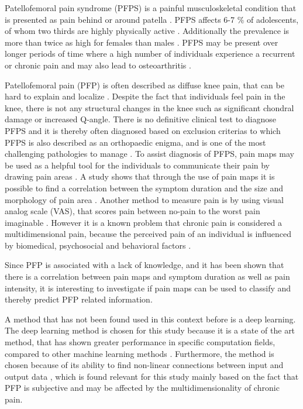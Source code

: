 Patellofemoral pain syndrome (PFPS) is a painful musculoskeletal condition that is presented as pain behind or around patella \citep{Maclachlan2017, Smith2015}. PFPS affects 6-7 \% of adolescents, of whom two thirds are highly physically active \citep{Rathleff2015}. Additionally the prevalence is more than twice as high for females than males \citep{Petersen2013, Rathleff2015}.
PFPS may be present over longer periods of time where a high number of individuals experience a recurrent or chronic pain \citep{Witvrouw2014} and may also lead to osteoarthritis \citep{Petersen2013, Crossley2016}.

\noindent
Patellofemoral pain (PFP) is often described as diffuse knee pain, that can be hard to explain and localize \citep{Witvrouw2014}. Despite the fact that individuals feel pain in the knee, there is not any structural changes in the knee such as significant chondral damage or increased Q-angle. There is no definitive clinical test to diagnose PFPS and it is thereby often diagnosed based on exclusion criterias \citep{Petersen2013} to which PFPS is also described as an orthopaedic enigma, and is one of the most challenging pathologies to manage \citep{Dye2001}. 
To assist diagnosis of PFPS, pain maps may be used as a helpful tool for the individuals to communicate their pain by drawing pain areas \citep{Boudreau2016}. A study shows that through the use of pain maps it is possible to find a correlation between the symptom duration and the size and morphology of pain area \citep{Boudreau2017}. 
Another method to measure pain is by using visual analog scale (VAS), that scores pain between no-pain to the worst pain imaginable \citep{Haefeli2005}. However it is a known problem that chronic pain is considered a multidimensional pain, because the perceived pain of an individual is influenced by biomedical, psychosocial and behavioral factors \citep{Dansie2013}.

\noindent
Since PFP is associated with a lack of knowledge, and it has been shown that there is a correlation between pain maps and symptom duration as well as pain intensity, it is interesting to investigate if pain maps can be used to classify and thereby predict PFP related information. 

\noindent
A method that has not been found used in this context before is a deep learning. The deep learning method is chosen for this study because it is a state of the art method, that has shown greater performance in specific computation fields, compared to other machine learning methods \citep{LeCun2015}.
Furthermore, the method is chosen because of its ability to find non-linear connections between input and output data \citep{LeCun2015}, which is found relevant for this study mainly based on the fact that PFP is subjective and may be affected by the multidimensionality of chronic pain.  \\



